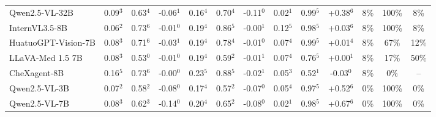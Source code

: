 \begin{table}[t]
\begin{tabular}{l@{\hspace{3pt}}ccc@{\hspace{4pt}}ccc@{\hspace{4pt}}ccc@{\hspace{4pt}}ccc}
Qwen2.5-VL-32B & \cellcolor{cfSage2}0.09$^{3}$ & \cellcolor{cfSage2}0.63$^{4}$ & \cellcolor{cfTerra2}-0.06$^{1}$ & \cellcolor{cfSage3}0.16$^{4}$ & \cellcolor{cfSage2}0.70$^{4}$ & \cellcolor{cfTerra3}-0.11$^{0}$ & \cellcolor{cfSage1}0.02$^{1}$ & \cellcolor{cfSage4}0.99$^{5}$ & \cellcolor{cfSlate4}+0.38$^{6}$ & \cellcolor{cfSlate2}8\% & \cellcolor{cfSlate4}100\% & 8\% \\
InternVL3.5-8B & \cellcolor{cfSage2}0.06$^{2}$ & \cellcolor{cfSage2}0.73$^{6}$ & \cellcolor{cfTerra1}-0.01$^{0}$ & \cellcolor{cfSage3}0.19$^{4}$ & \cellcolor{cfSage3}0.86$^{5}$ & \cellcolor{cfTerra1}-0.00$^{1}$ & \cellcolor{cfSage2}0.12$^{5}$ & \cellcolor{cfSage4}0.98$^{5}$ & \cellcolor{cfSlate2}+0.03$^{6}$ & \cellcolor{cfSlate2}8\% & \cellcolor{cfSlate4}100\% & 8\% \\
HuatuoGPT-Vision-7B & \cellcolor{cfSage2}0.08$^{3}$ & \cellcolor{cfSage2}0.71$^{6}$ & \cellcolor{cfTerra2}-0.03$^{1}$ & \cellcolor{cfSage3}0.19$^{4}$ & \cellcolor{cfSage3}0.78$^{4}$ & \cellcolor{cfTerra1}-0.01$^{0}$ & \cellcolor{cfSage2}0.07$^{4}$ & \cellcolor{cfSage4}0.99$^{5}$ & \cellcolor{cfSlate1}+0.01$^{4}$ & \cellcolor{cfSlate2}8\% & \cellcolor{cfSlate3}67\% & 12\% \\
LLaVA-Med 1.5 7B & \cellcolor{cfSage2}0.08$^{3}$ & \cellcolor{cfSage1}0.53$^{0}$ & \cellcolor{cfTerra1}-0.01$^{0}$ & \cellcolor{cfSage3}0.19$^{4}$ & \cellcolor{cfSage1}0.59$^{2}$ & \cellcolor{cfTerra1}-0.01$^{1}$ & \cellcolor{cfSage2}0.07$^{4}$ & \cellcolor{cfSage3}0.76$^{5}$ & \cellcolor{cfSlate1}+0.00$^{1}$ & \cellcolor{cfSlate2}8\% & \cellcolor{cfSlate2}17\% & 50\% \\
CheXagent-8B & \cellcolor{cfSage3}0.16$^{5}$ & \cellcolor{cfSage2}0.73$^{6}$ & \cellcolor{cfTerra1}-0.00$^{0}$ & \cellcolor{cfSage4}0.23$^{5}$ & \cellcolor{cfSage3}0.88$^{5}$ & \cellcolor{cfTerra1}-0.02$^{1}$ & \cellcolor{cfSage2}0.05$^{3}$ & \cellcolor{cfSage1}0.52$^{1}$ & \cellcolor{cfTerra2}-0.03$^{0}$ & \cellcolor{cfSlate2}8\% & \cellcolor{cfSlate1}0\% & -- \\
Qwen2.5-VL-3B & \cellcolor{cfSage2}0.07$^{2}$ & \cellcolor{cfSage1}0.58$^{2}$ & \cellcolor{cfTerra2}-0.08$^{0}$ & \cellcolor{cfSage3}0.17$^{4}$ & \cellcolor{cfSage1}0.57$^{2}$ & \cellcolor{cfTerra2}-0.07$^{0}$ & \cellcolor{cfSage1}0.05$^{4}$ & \cellcolor{cfSage4}0.97$^{5}$ & \cellcolor{cfSlate4}+0.52$^{6}$ & \cellcolor{cfSlate1}0\% & \cellcolor{cfSlate4}100\% & 0\% \\
Qwen2.5-VL-7B & \cellcolor{cfSage2}0.08$^{3}$ & \cellcolor{cfSage2}0.62$^{3}$ & \cellcolor{cfTerra3}-0.14$^{0}$ & \cellcolor{cfSage3}0.20$^{4}$ & \cellcolor{cfSage2}0.65$^{2}$ & \cellcolor{cfTerra2}-0.08$^{0}$ & \cellcolor{cfSage1}0.02$^{1}$ & \cellcolor{cfSage4}0.98$^{5}$ & \cellcolor{cfSlate4}+0.67$^{6}$ & \cellcolor{cfSlate1}0\% & \cellcolor{cfSlate4}100\% & 0\% \\

\end{tabular}
\end{table}
